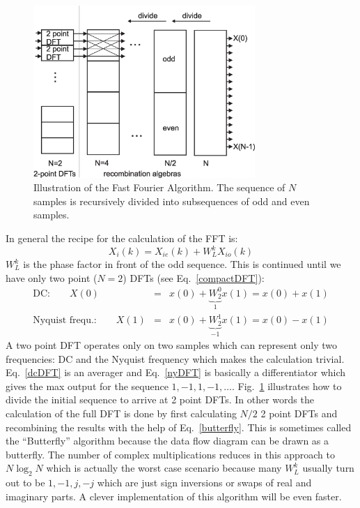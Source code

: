 \documentclass[12pt,a4paper]{article}
\begin{document}
\begin{figure}[!hbt]
\begin{center}
\mbox{\includegraphics[width=0.75\textwidth]{fft_div}}
\end{center}
\caption{Illustration of the Fast Fourier Algorithm. The sequence
of $N$ samples is recursively divided into subsequences of odd and
even samples.
\label{fft_div}}
\end{figure}

In general the recipe for the calculation of the FFT is:
\begin{equation}
X_{i}(k) = X_{ie}(k) + W_{L}^{k} X_{io}(k)
\label{butterfly}
\end{equation}
$W_{L}^{k}$ is the phase factor in front of the odd sequence.
This is continued until we have only two point ($N=2$) 
DFTs (see Eq.~\ref{compactDFT}):
\begin{eqnarray}
\mbox{DC:} \qquad X(0) & = & x(0) + \underbrace{W_2^0}_{1} x(1) = x(0) + x(1) \label{dcDFT}\\
\mbox{Nyquist frequ.:} \qquad X(1) & = & x(0) + \underbrace{W_2^1}_{-1} x(1) = x(0) - x(1) \label{nyDFT}
\end{eqnarray}
A two point DFT operates only on two samples which can represent only
two frequencies: DC and the Nyquist frequency which makes the
calculation trivial. Eq.~\ref{dcDFT} is an averager and
Eq.~\ref{nyDFT} is basically a differentiator which gives the max output
for the sequence $1,-1,1,-1,\ldots$.  Fig.~\ref{fft_div} illustrates
how to divide the initial sequence to arrive at 2 point DFTs. In other
words the calculation of the full DFT is done by first calculating
$N/2$ 2 point DFTs and recombining the results with the help of
Eq.~\ref{butterfly}. This is sometimes called the ``Butterfly''
algorithm because the data flow diagram can be drawn as a butterfly.
The number of complex multiplications reduces in this approach to $N
\log_2 N$ which is actually the worst case scenario because many
$W_{L}^{k}$ usually turn out to be $1,-1,j,-j$ which are just sign
inversions or swaps of real and imaginary parts. A clever
implementation of this algorithm will be even faster.
\end{document}
